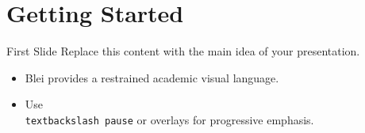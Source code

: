 \documentclass{beamer}
\title{\ToolkitBeamerTitle}
\author{\ToolkitBeamerAuthor}
\institute{\ToolkitBeamerInstitute}
\date{\ToolkitBeamerDate}
\begin{document}
\begin{frame}
  \maketitle
\end{frame}

\section{Getting Started}

\begin{frame}{First Slide}
  Replace this content with the main idea of your presentation.
  \begin{itemize}
    \item Blei provides a restrained academic visual language.
    \item Use \texttt{\\textbackslash pause} or overlays for progressive emphasis.
  \end{itemize}
\end{frame}
\end{document}
